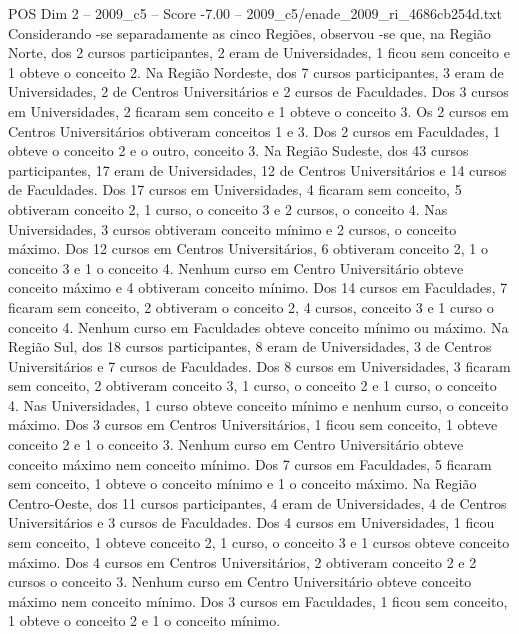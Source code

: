 \begin{textsample}{POS Dim 2 – 2009\_c5 – Score -7.00 – 2009\_c5/enade\_2009\_ri\_4686cb254d.txt}
Considerando -se separadamente as cinco Regiões, observou -se que, na Região Norte, dos 2 cursos participantes, 2 eram de Universidades, 1 ficou sem conceito e 1 obteve o conceito 2.
Na Região Nordeste, dos 7 cursos participantes, 3 eram de Universidades, 2 de Centros Universitários e 2 cursos de Faculdades.
Dos 3 cursos em Universidades, 2 ficaram sem conceito e 1 obteve o conceito 3.
Os 2 cursos em Centros Universitários obtiveram conceitos 1 e 3.
Dos 2 cursos em Faculdades, 1 obteve o conceito 2 e o outro, conceito 3.
Na Região Sudeste, dos 43 cursos participantes, 17 eram de Universidades, 12 de Centros Universitários e 14 cursos de Faculdades.
Dos 17 cursos em Universidades, 4 ficaram sem conceito, 5 obtiveram conceito 2, 1 curso, o conceito 3 e 2 cursos, o conceito 4.
Nas Universidades, 3 cursos obtiveram conceito mínimo e 2 cursos, o conceito máximo.
Dos 12 cursos em Centros Universitários, 6 obtiveram conceito 2, 1 o conceito 3 e 1 o conceito 4.
Nenhum curso em Centro Universitário obteve conceito máximo e 4 obtiveram conceito mínimo.
Dos 14 cursos em Faculdades, 7 ficaram sem conceito, 2 obtiveram o conceito 2, 4 cursos, conceito 3 e 1 curso o conceito 4.
Nenhum curso em Faculdades obteve conceito mínimo ou máximo.
Na Região Sul, dos 18 cursos participantes, 8 eram de Universidades, 3 de Centros Universitários e 7 cursos de Faculdades.
Dos 8 cursos em Universidades, 3 ficaram sem conceito, 2 obtiveram conceito 3, 1 curso, o conceito 2 e 1 curso, o conceito 4.
Nas Universidades, 1 curso obteve conceito mínimo e nenhum curso, o conceito máximo.
Dos 3 cursos em Centros Universitários, 1 ficou sem conceito, 1 obteve conceito 2 e 1 o conceito 3.
Nenhum curso em Centro Universitário obteve conceito máximo nem conceito mínimo.
Dos 7 cursos em Faculdades, 5 ficaram sem conceito, 1 obteve o conceito mínimo e 1 o conceito máximo.
Na Região Centro-Oeste, dos 11 cursos participantes, 4 eram de Universidades, 4 de Centros Universitários e 3 cursos de Faculdades.
Dos 4 cursos em Universidades, 1 ficou sem conceito, 1 obteve conceito 2, 1 curso, o conceito 3 e 1 cursos obteve conceito máximo.
Dos 4 cursos em Centros Universitários, 2 obtiveram conceito 2 e 2 cursos o conceito 3.
Nenhum curso em Centro Universitário obteve conceito máximo nem conceito mínimo.
Dos 3 cursos em Faculdades, 1 ficou sem conceito, 1 obteve o conceito 2 e 1 o conceito mínimo.

\end{textsample}
